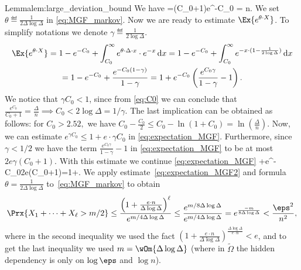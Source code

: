 \begin{prevproof}{Lemma}{lem:large_deviation_bound}
	We have 
	\be
	\label{eq:C0}
	=\Delta(C_0+1)e^{-C_0} = n.
	\ee 
	We set $\theta\eqdef\frac{1}{2\Delta\log\Delta}$ in \eqref{eq:MGF_markov}. Now we are ready to estimate $\Ex{e^{\theta\cdot X}}$.
	To simplify notations we denote $\gamma\eqdef\frac{1}{2\log\Delta}$.
	\begin{multline}
	\Ex{e^{\theta\cdot X}}=1-e^{-C_0}+\int_{C_0}^{\infty}e^{\theta\cdot\Delta\cdot x}\cdot e^{-x}\,\mathrm{d}x=
	1-e^{-C_0}+\int_{C_0}^{\infty}e^{-x\cdot(1-\frac{1}{2\log\Delta})}\,\mathrm{d}x\\
	=1-e^{-C_0}+\frac{e^{-C_0(1-\gamma)}}{1-\gamma}=1+e^{-C_0}\left(\frac{e^{C_0\gamma}}{1-\gamma}-1\right).
	\label{eq:expectation_MGF}
	\end{multline}
	We notice that $\gamma C_0<1$, since from \eqref{eq:C0} we can conclude that $\frac{e^{C_0}}{C_0+1}=\frac{\Delta}{n}\implies C_0<2\log\Delta=1/\gamma$. The last implication can be obtained as follows: for $C_0 > 2.52,$ we have $C_0 - \frac{C_0}{2}\le C_0-\ln(1+C_0)=\ln(\frac{\Delta}{n})$. Now, we can estimate $e^{\gamma C_0}\le 1 + e\cdot\gamma C_0$ in \eqref{eq:expectation_MGF}. Furthermore, since $\gamma<1/2$ we have
	the term $\frac{e^{C_0\gamma}}{1-\gamma}-1$ in \eqref{eq:expectation_MGF} to be at most $2e\gamma(C_0+1)$. With this estimate we continue \eqref{eq:expectation_MGF}
	\be
	+e^{-C_0}2e\gamma(C_0+1)=1+.
	\label{eq:expectation_MGF2}
	\ee
	We apply estimate~\eqref{eq:expectation_MGF2} and formula $\theta=\frac{1}{2\Delta\log\Delta}$ to~\eqref{eq:MGF_markov} to obtain
	\[
	\Prx{X_1+\cdots+X_\ell > m/2}\le \frac{\left(1+\frac{e\cdot n}{\Delta\log\Delta}\right)^\ell}{e^{m/4\Delta\log\Delta}}
	\le\frac{e^{m/8\Delta\log\Delta}}{e^{m/4\Delta\log\Delta}}=e^{\frac{-m}{8\Delta\log\Delta}}<\frac{\eps^2}{n^2},
	\]
	where in the second inequality we used the fact $\left(1+\frac{e\cdot n}{\Delta\log\Delta}\right)^{\frac{\Delta\log\Delta}{e\cdot n}}<e$, and to get the last inequality
	we used $m=\wOm{\Delta\log\Delta}$ (where in $\widetilde{\Omega}$ the hidden dependency is only on  $\log \eps$ and $\log n$).
\end{prevproof}



